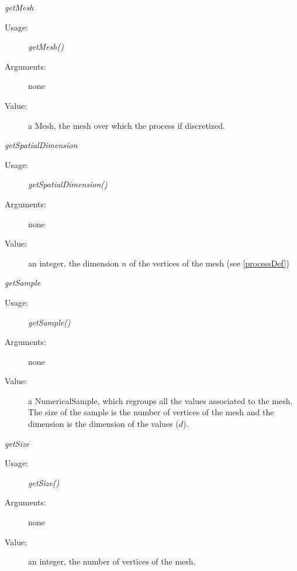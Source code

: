 \begin{description}
\begin{description}
\item \textit{getMesh}
\begin{description}
\item[Usage:] \textit{getMesh()}
\item[Arguments:] none
\item[Value:] a Mesh, the mesh over which the process if discretized.
\end{description}
\bigskip


\item \textit{getSpatialDimension}
\begin{description}
\item[Usage:] \textit{getSpatialDimension()}
\item[Arguments:] none
\item[Value:] an integer, the dimension $n$ of the vertices of the mesh (see \ref{processDef})
\end{description}
\bigskip

\item \textit{getSample}
\begin{description}
\item[Usage:] \textit{getSample()}
\item[Arguments:] none
\item[Value:] a NumericalSample, which regroups all the values associated to the mesh. The size of the sample is the number of vertices of the mesh and the dimension is the dimension of the values ($d$).
\end{description}
\bigskip

\item \textit{getSize}
\begin{description}
\item[Usage:] \textit{getSize()}
\item[Arguments:] none
\item[Value:] an integer, the number of vertices of the mesh.
\end{description}
\bigskip


\end{description}
\end{description}
